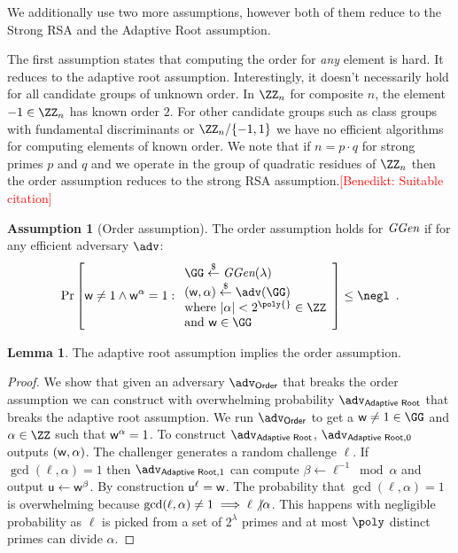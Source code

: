\documentclass{article}
\theoremstyle{definition}
\newtheorem{lemma}{Lemma}
\newtheorem{assumption}{Assumption}
\newcommand{\benedikt}[1]{{\textcolor{red}{[Benedikt: #1]}}}
\newcommand{\benedikt}[1]{}
\begin{document}
We additionally use two more assumptions, however both of them reduce to the Strong RSA and the Adaptive Root assumption.

The first assumption states that computing the order for \emph{any} element is hard. It reduces to the adaptive root assumption. Interestingly, it doesn't necessarily hold for all candidate groups of unknown order. In $\ZZ_n$ for composite $n$, the element $-1\in \ZZ_n$ has known order $2$. For other candidate groups such as class groups with fundamental discriminants or $\ZZ_n/\{-1,1\}$ we have no efficient algorithms for computing elements of known order. We note that if $n=p\cdot q$ for strong primes $p$ and $q$ and we operate in the group of quadratic residues of $\ZZ_n$ then the order assumption reduces to the strong RSA assumption.\benedikt{Suitable citation}
\begin{assumption}[Order assumption]
\label{assum:order}
	The order assumption holds for $\textit{GGen}$ if for any efficient adversary $\adv$:
\[        
                \Pr\left[\gr{w}\neq 1 \wedge \gr{w}^{\alpha}= 1: 
                \begin{array}{l} 
                      \GG \sample \ggen(\lambda) \\ 
                      (\gr{w},\alpha) \sample \adv(\GG) \\
                      \text{where } |\alpha|<2^{\poly{}}\in \ZZ\\
                      \text{and } \gr{w}\in \GG
                \end{array} 
        \right] \leq \negl \enspace .
\]
\end{assumption}
\begin{lemma}
\label{lem:ordertoadaptive}
	The adaptive root assumption implies the order assumption.
\end{lemma}
\begin{proof}
	We show that given an adversary $\adv_{\textsf{Order}}$ that breaks the order assumption we can construct with overwhelming probability $\adv_{\textsf{Adaptive Root}}$ that breaks the adaptive root assumption. We run $\adv_{\textsf{Order}}$ to get a $\gr{w}\neq 1\in \GG$ and $\alpha \in \ZZ$ such that $\mathsf{w}^{\alpha}=1$. To construct $\adv_{\textsf{Adaptive Root}}$, $\adv_{\textsf{Adaptive Root},0}$ outputs $(\mathsf{w},\alpha)$. The challenger generates a random challenge $\ell$. If $\gcd(\ell,\alpha)=1$ then $\adv_{\textsf{Adaptive Root},1}$ can compute $\beta\gets \ell^{-1} \bmod \alpha$ and output $\mathsf{u}\gets\mathsf{w}^{\beta}$. By construction $\mathsf{u}^{\ell}=\mathsf{w}$. The probability that $\gcd(\ell,\alpha)=1$ is overwhelming because $\gcd(\ell,\alpha)\neq 1 \implies \ell \not\vert \alpha$. This happens with negligible probability as $\ell$ is picked from a set of $2^\lambda$ primes and at most $\poly$ distinct primes can divide $\alpha$.
	\end{proof}
	
\end{document}
